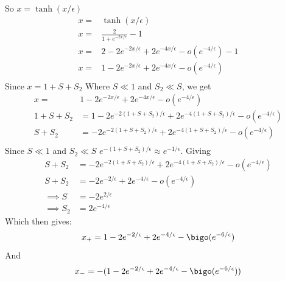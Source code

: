 \documentclass{/home/janmebows/Documents/LatexTemplates/myassignment}
\begin{document}
\begin{enumerate}
\begin{enumerate}
        So $x = \tanh(x/\epsilon)$
        \begin{align*}
            x =& \tanh(x/\epsilon)\\
            x=& \frac{2}{1 + e^{-2x/\epsilon}} - 1\\
            x=& 2 - 2e^{-2x/\epsilon} + 2e^{-4x/\epsilon} - o(e^{-4/\epsilon})-1\\
            x=& 1 - 2e^{-2x/\epsilon} + 2e^{-4x/\epsilon} - o(e^{-4/\epsilon})\\
        \end{align*}
        Since $x = 1 + S + S_2$ Where $S \ll 1$ and $S_2 \ll S$, we get
        \begin{align*}
            x=& 1 - 2e^{-2x/\epsilon} + 2e^{-4x/\epsilon} - o(e^{-4/\epsilon})\\
            1 + S +S_2 &=1 - 2e^{-2(1+S+S_2)/\epsilon} + 2e^{-4(1+S+S_2)/\epsilon} - o(e^{-4/\epsilon})\\
            S+S_2 &=  -2e^{-2(1+S+S_2)/\epsilon} + 2e^{-4(1+S+S_2)/\epsilon} - o(e^{-4/\epsilon})\\
        \end{align*}
        Since $S\ll 1$ and $S_2 \ll S$ $e^{-(1+S+S_2)/\epsilon} \approx e^{-1/\epsilon}$. Giving
        \begin{align*}
            S+S_2 &=  -2e^{-2(1+S+S_2)/\epsilon} + 2e^{-4(1+S+S_2)/\epsilon} - o(e^{-4/\epsilon})\\
            S+S_2 &=  -2e^{-2/\epsilon} + 2e^{-4/\epsilon} - o(e^{-4/\epsilon})\\
            \implies S &= -2e^{2/\epsilon}\\
            \implies S_2 &= 2e^{-4/\epsilon}
        \end{align*}
        Which then gives:
        \[x_+ = 1 -2e^{-2/\epsilon} + 2e^{-4/\epsilon} - \bigo(e^{-6/\epsilon})\]
        And 
        \[x_- = -(1 -2e^{-2/\epsilon} + 2e^{-4/\epsilon} - \bigo(e^{-6/\epsilon}))\]


\end{enumerate}
\end{enumerate}
\end{document}
